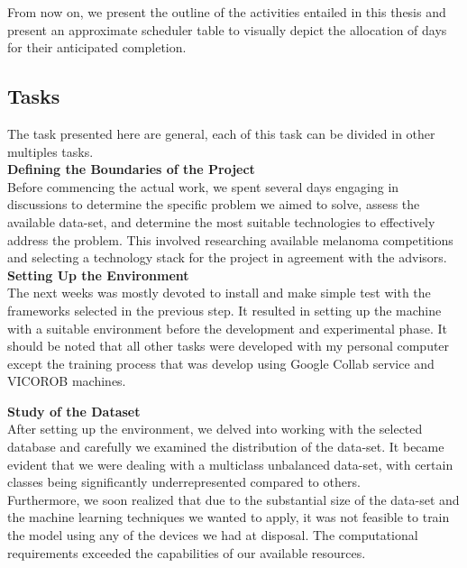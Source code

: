 From now on, we present the outline of the activities entailed in this thesis and present
an approximate scheduler table to visually depict the allocation of days for their anticipated completion.

\subsection{Tasks}

The task presented here are general, each of this task can be divided in other multiples tasks. \\

\vspace{0.5cm}
\textbf{Defining the Boundaries of the Project} \\

Before commencing the actual work, we spent several days engaging in discussions to determine the specific problem we aimed to solve, assess the available data-set, and determine the most suitable technologies to effectively address the problem. This involved researching available melanoma competitions and selecting a technology stack for the project in agreement with the advisors. \\

\vspace{0.5cm}
\textbf{Setting Up the Environment} \\

The next weeks was mostly devoted to install and make simple test with the frameworks selected
in the previous step. It resulted in setting up the machine with a suitable environment
before the development and experimental phase. It should be noted that all other tasks were developed with my personal computer except the training process that was develop using Google Collab service and VICOROB machines. \\

\newpage

\vspace{0.5cm}
\textbf{Study of the Dataset} \\

After setting up the environment, we delved into working with the selected database and carefully
we examined the distribution of the data-set. It became evident that we were dealing
with a multiclass unbalanced data-set, with certain classes being significantly underrepresented compared to others. \\

Furthermore, we soon realized that due to the substantial size of the data-set and the machine learning techniques we wanted to apply,
it was not feasible to train the model using any of the devices we had at disposal.
The computational requirements exceeded the capabilities of our available resources. \\

